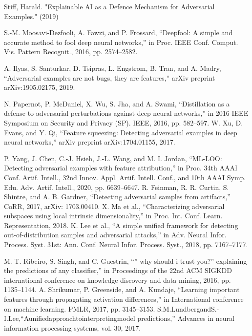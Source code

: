 \documentclass[10pt, conference, a4paper, final]{IEEEtran}
\begin{document}
\begin{thebibliography}{01}
    Stiff, Harald. "Explainable AI as a Defence Mechanism for Adversarial Examples." (2019)

    S.-M. Moosavi-Dezfooli, A. Fawzi, and P. Frossard, “Deepfool: A simple and accurate method to fool deep neural networks,” in Proc.
IEEE Conf. Comput. Vis. Pattern Recognit., 2016, pp. 2574–2582.

A. Ilyas, S. Santurkar, D. Tsipras, L. Engstrom, B. Tran, and A. Madry,
“Adversarial examples are not bugs, they are features,” arXiv preprint
arXiv:1905.02175, 2019.

N. Papernot, P. McDaniel, X. Wu, S. Jha, and A. Swami, “Distillation as a defense to adversarial perturbations against deep neural networks,” in 2016 IEEE Symposium on Security and Privacy (SP). IEEE, 2016, pp. 582–597.
W. Xu, D. Evans, and Y. Qi, “Feature squeezing: Detecting adversarial
examples in deep neural networks,” arXiv preprint arXiv:1704.01155,
2017.

 P. Yang, J. Chen, C.-J. Hsieh, J.-L. Wang, and M. I. Jordan, “ML-LOO:
Detecting adversarial examples with feature attribution,” in Proc. 34th AAAI Conf. Artif. Intell., 32nd Innov. Appl. Artif. Intell. Conf., and 10th AAAI Symp. Edu. Adv. Artif. Intell., 2020, pp. 6639–6647.
 R. Feinman, R. R. Curtin, S. Shintre, and A. B. Gardner, “Detecting adversarial samples from artifacts,” CoRR, 2017, arXiv: 1703.00410.
 X. Ma et al., “Characterizing adversarial subspaces using local intrinsic dimensionality,” in Proc. Int. Conf. Learn. Representation, 2018.
 K. Lee et al., “A simple unified framework for detecting out-of-distribution samples and adversarial attacks,” in Adv. Neural Infor. Process. Syst. 31st: Ann. Conf. Neural Infor. Process. Syst., 2018, pp. 7167–7177.

 M. T. Ribeiro, S. Singh, and C. Guestrin, “” why should i trust you?” explaining the predictions of any classifier,” in Proceedings of the 22nd ACM SIGKDD international conference on knowledge discovery and data mining, 2016, pp. 1135–1144.
 A. Shrikumar, P. Greenside, and A. Kundaje, “Learning important features through propagating activation differences,” in International conference on machine learning. PMLR, 2017, pp. 3145–3153.
 S.M.LundbergandS.-I.Lee,“Aunifiedapproachtointerpretingmodel predictions,” Advances in neural information processing systems, vol. 30, 2017.


\end{thebibliography}
\end{document}
